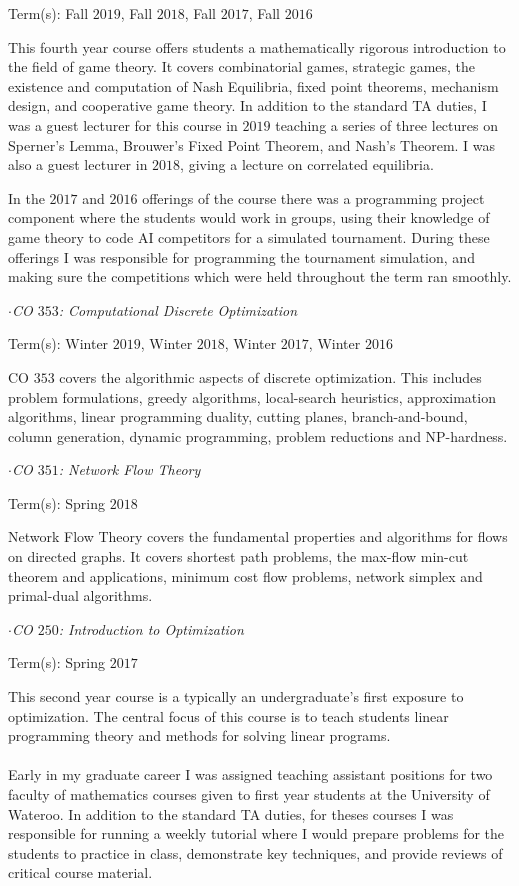 \documentclass{article}
\begin{document}
Term(s): Fall $2019$, Fall $2018$, Fall $2017$, Fall $2016$

This fourth year course offers students a mathematically rigorous introduction to the field of game theory. It covers combinatorial games, strategic games, the existence and computation of Nash Equilibria, fixed point theorems, mechanism design, and cooperative game theory. In addition to the standard TA duties, I was a guest lecturer for this course in $2019$ teaching a series of three lectures on Sperner's Lemma, Brouwer's Fixed Point Theorem, and Nash's Theorem. I was also a guest lecturer in $2018$, giving a lecture on correlated equilibria. 

In the $2017$ and $2016$ offerings of the course there was a programming project component where the students would work in groups, using their knowledge of game theory to code AI competitors for a simulated tournament. During these offerings I was responsible for programming the tournament simulation, and making sure the competitions which were held throughout the term ran smoothly.

\noindent$\cdot$\emph{CO $353$: Computational Discrete Optimization}

Term(s): Winter $2019$, Winter $2018$, Winter $2017$, Winter $2016$

CO $353$ covers the algorithmic aspects of discrete optimization. This includes problem formulations, greedy algorithms, local-search heuristics, approximation algorithms, linear programming duality, cutting planes, branch-and-bound, column generation, dynamic programming, problem reductions and NP-hardness.

\noindent$\cdot$\emph{CO $351$: Network Flow Theory}

Term(s): Spring $2018$

Network Flow Theory covers the fundamental properties and algorithms for flows on directed graphs. It covers shortest path problems, the max-flow min-cut theorem and applications, minimum cost flow problems, network simplex and primal-dual algorithms.

\noindent$\cdot$\emph{CO $250$: Introduction to Optimization}

Term(s): Spring $2017$

This second year course is a typically an undergraduate's first exposure to optimization. The central focus of this course is to teach students linear programming theory and methods for solving linear programs.

\paragraph{}
Early in my graduate career I was assigned teaching assistant positions for two faculty of mathematics courses given to first year students at the University of Wateroo. In addition to the standard TA duties, for theses courses I was responsible for running a weekly tutorial where I would prepare problems for the students to practice in class, demonstrate key techniques, and provide reviews of critical course material.
\bigskip
\end{document}
